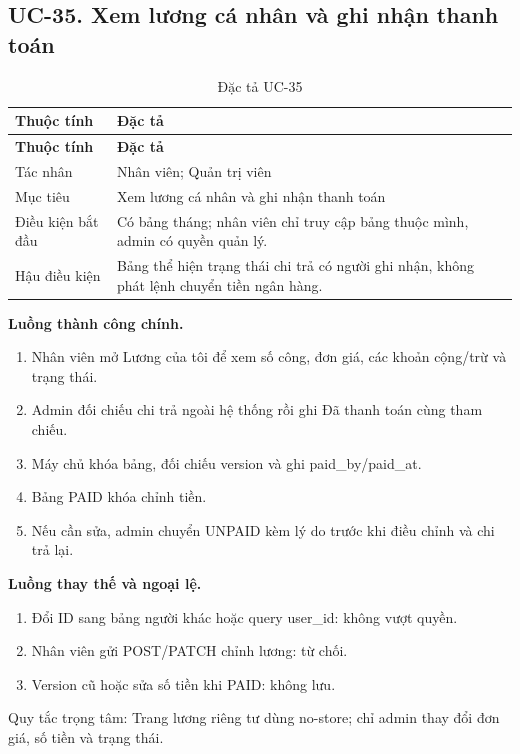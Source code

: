 \clearpage

\subsection{UC-35.\allowbreak{} Xem lương cá nhân và ghi nhận thanh toán}
\label{uc:35}

{\small\setlength{\tabcolsep}{3pt}\renewcommand{\arraystretch}{1.12}
\begin{longtable}{@{}L{\textwidth-1.32pt\relax} L{\textwidth-4.68pt\relax}@{}}
\caption{Đặc tả UC-35}\\
\toprule
\textbf{Thuộc tính} & \textbf{Đặc tả}\\\midrule
\endfirsthead
\toprule
\textbf{Thuộc tính} & \textbf{Đặc tả}\\\midrule
\endhead
\bottomrule\endlastfoot
Tác nhân & Nhân viên; Quản trị viên\\[3pt]
Mục tiêu & Xem lương cá nhân và ghi nhận thanh toán\\[3pt]
Điều kiện bắt đầu & Có bảng tháng; nhân viên chỉ truy cập bảng thuộc mình, admin có quyền quản lý.\allowbreak{}\\[3pt]
Hậu điều kiện & Bảng thể hiện trạng thái chi trả có người ghi nhận, không phát lệnh chuyển tiền ngân hàng.\allowbreak{}\\[3pt]
\end{longtable}}
\noindent\textbf{Luồng thành công chính.}
\begin{enumerate}
\item Nhân viên mở Lương của tôi để xem số công, đơn giá, các khoản cộng/\allowbreak{}trừ và trạng thái.\allowbreak{}
\item Admin đối chiếu chi trả ngoài hệ thống rồi ghi Đã thanh toán cùng tham chiếu.\allowbreak{}
\item Máy chủ khóa bảng, đối chiếu version và ghi paid\_\allowbreak{}by/\allowbreak{}paid\_\allowbreak{}at.\allowbreak{}
\item Bảng PAID khóa chỉnh tiền.\allowbreak{}
\item Nếu cần sửa, admin chuyển UNPAID kèm lý do trước khi điều chỉnh và chi trả lại.\allowbreak{}
\end{enumerate}
\noindent\textbf{Luồng thay thế và ngoại lệ.}
\begin{enumerate}
\item Đổi ID sang bảng người khác hoặc query user\_\allowbreak{}id:\allowbreak{} không vượt quyền.\allowbreak{}
\item Nhân viên gửi POST/\allowbreak{}PATCH chỉnh lương:\allowbreak{} từ chối.\allowbreak{}
\item Version cũ hoặc sửa số tiền khi PAID:\allowbreak{} không lưu.\allowbreak{}
\end{enumerate}
Quy tắc trọng tâm:\allowbreak{} Trang lương riêng tư dùng no-store; chỉ admin thay đổi đơn giá, số tiền và trạng thái.\allowbreak{}

